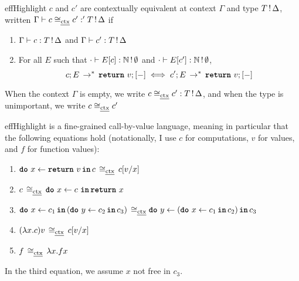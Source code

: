 

\begin{definition}{effHighlight}\label{dfn:ctx-equiv}
  $c$ and $c'$ are contextually equivalent at context $\Gamma$ and type $\effectType{T}$, written $\Gamma \vdash c \contextequiv c': '\effectType{T}$ if 
  \begin{enumerate}
    \item $\type{c}{\effectType{T}}$ and $\type{c'}{\effectType{T}}$
    \item For all $E$ such that $\cdot \vdash {E[c]}: {\effectType[\emptyset]{\mathbb{N}}}$  and $\cdot \vdash {E[c']}: {\effectType[\emptyset]{\mathbb{N}}}$, 
    \[\effconfiguration{c}{E} \, \to^{*} \, {\effconfiguration{\return{v}}{[-]}} \iff \effconfiguration{c'}{E} \, \to^{*} \, \effconfiguration{\return{v}}{[-]}\]
  \end{enumerate}

  When the context $\Gamma$ is empty, we write $c \contextequiv c': \effectType{T}$, and when the type is unimportant, we write $c \contextequiv c'$
\end{definition}
\vspace{-\baselineskip}
\begin{theorem}{effHighlight}\label{thm:fine-grained-cbv}
  \efflang{} is a fine-grained call-by-value language, meaning in particular that the following equations hold (notationally, I use $c$ for computations, $v$ for values, and $f$ for function values):
  \begin{enumerate}
    \item $\bind{x}{\return{v}}{c} \, \contextequiv \, c[v/x]$
    \item $c \, \contextequiv \, \bind{x}{c \,}{\return{x}}$
    \item $\bind{x}{c_1}{(\bind{y}{c_2}{c_3})} \, \contextequiv \bind{y}{(\bind{x}{c_1}{c_2})}{c_3}$
    \item $(\lambda x. c) v \, \contextequiv \, c[v/x]$
    \item $f \, \contextequiv \, \lambda x. f x$
  \end{enumerate}
In the third equation, we assume $x$ not free in $c_3$.
\end{theorem}

